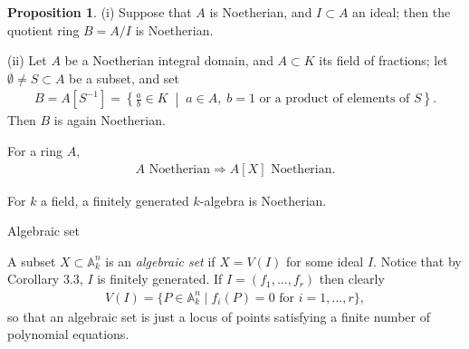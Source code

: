 \documentclass[8pt]{beamer}
\theoremstyle{definition}
\newtheorem{proposition}[theorem]{Proposition}
\begin{document}
    \begin{frame}
        \begin{proposition}
            (i) Suppose that $A$ is Noetherian, and $I \subset A$ an ideal; then the quotient ring $B = A/I$ is Noetherian.

            (ii) Let $A$ be a Noetherian integral domain, and $A \subset K$ its field of fractions; let $\emptyset \neq S \subset A$ be a subset, and set
            \begin{align*}
                B = A[S^{-1}] = \left\{\frac{a}{b} \in K \;\middle|\; a \in A,\; b = 1\text{ or a product of elements of }S\right\}.
            \end{align*}
            Then $B$ is again Noetherian.
        \end{proposition}

        \begin{theorem} \label{thm:hilbert-basis}
            For a ring $A$,
            \begin{align*}
                A \text{ Noetherian} \Rightarrow A[X] \text{ Noetherian}.
            \end{align*}
        \end{theorem}

        \begin{corollary}
            For $k$ a field, a finitely generated $k$-algebra is Noetherian.
        \end{corollary}
    \end{frame}

    \begin{frame}{Algebraic set}
        \begin{definition} \label{def:algebraic-set}
            A subset $X \subset \mathbb{A}^n_k$ is an \emph{algebraic set} if $X = V(I)$ for some ideal $I$. Notice that by Corollary 3.3, $I$ is finitely generated. If $I = (f_1, \dots, f_r)$ then clearly
            \begin{align*}
                V(I) = \{P \in \mathbb{A}^n_k \mid f_i(P) = 0 \text{ for } i = 1, \dots, r\},
            \end{align*}
        so that an algebraic set is just a locus of points satisfying a finite number of polynomial equations.
        \end{definition}
    \end{frame}
\end{document}
